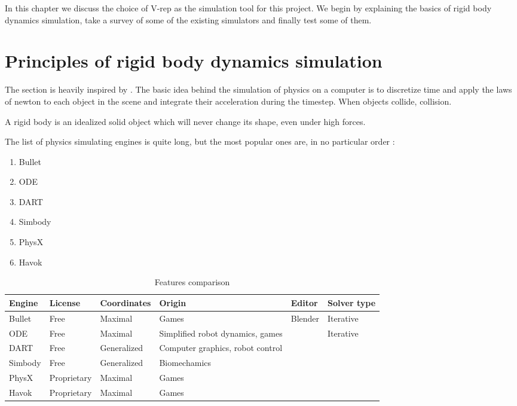 In this chapter we discuss the choice of V-rep as the simulation tool for this project. We begin by explaining the basics of rigid body dynamics simulation, take a survey of some of the existing simulators and finally test some of them.

\section{Principles of rigid body dynamics simulation}
The section is heavily inspired by \cite{bender2014interactive}.
The basic idea behind the simulation of physics on a computer is to discretize time and apply the laws of newton to each object in the scene and integrate their acceleration during the timestep. When objects collide, collision.

A rigid body is an idealized solid object which will never change its shape, even under high forces.

The list of physics simulating engines is quite long, but the most popular ones are, in no particular order :
\begin{enumerate}
\item Bullet
\item ODE
\item DART
\item Simbody
\item PhysX
\item Havok
\end{enumerate}

\begin{table}[htp]
\center
\begin{tabularx}{\textwidth}{@{} X X X X X X @{}}
\toprule
\textbf{Engine} & \textbf{License} & \textbf{Coordinates} & \textbf{Origin} & \textbf{Editor} &\textbf{Solver type}\\ 
\midrule
Bullet & Free & Maximal & Games & Blender & Iterative \\ 

ODE & Free & Maximal & Simplified robot dynamics, games & & Iterative\\ 

DART & Free & Generalized & Computer graphics, robot control & &\\

Simbody & Free & Generalized & Biomechamics & \\

PhysX & Proprietary & Maximal & Games & \\

Havok & Proprietary & Maximal & Games & \\
\bottomrule
\end{tabularx}
\caption{Features comparison\cite{engines_comparison}}
\label{table:specs}
\end{table}

